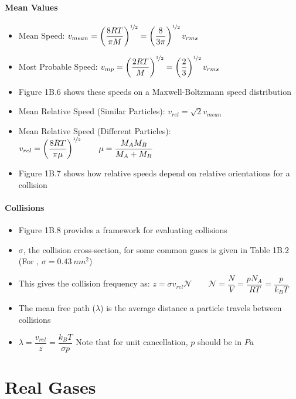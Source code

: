 \documentclass[12pt, openany, letterpaper]{memoir}
\begin{document}
\paragraph{Mean Values}
\begin{itemize}
	\item Mean Speed: $v_{mean} = \left(\dfrac{8RT}{\pi M}\right)^{\nicefrac{1}{2}} = \left(\dfrac{8}{3\pi}\right)^{\nicefrac{1}{2}}v_{rms}$
	\item Most Probable Speed: $v_{mp} = \left(\dfrac{2RT}{ M}\right)^{\nicefrac{1}{2}} = \left(\dfrac{2}{3}\right)^{\nicefrac{1}{2}}v_{rms}$
  \item Figure 1B.6 shows these speeds on a Maxwell-Boltzmann speed distribution
	\item Mean Relative Speed (Similar Particles): $v_{rel}=\sqrt{2}v_{mean}$
	\item Mean Relative Speed (Different Particles): $v_{rel} = \left(\dfrac{8RT}{\pi\mu}\right)^{\nicefrac{1}{2}} \hspace{2em} \mu = \dfrac{M_AM_B}{M_A+M_B}$
  \item Figure 1B.7 shows how relative speeds depend on relative orientations for a collision
\end{itemize}
\paragraph{Collisions}
\begin{itemize}
	\item Figure 1B.8 provides a framework for evaluating collisions
	\item $\sigma$, the collision cross-section, for some common gases is given in Table 1B.2 (For , $\sigma = 0.43~nm^2$)
	\item This gives the collision frequency as: $z=\sigma v_{rel}\mathcal{N}\hspace{2em}\mathcal{N} = \dfrac{N}{V} = \dfrac{pN_A}{RT} = \dfrac{p}{k_BT}$
	\item The mean free path ($\lambda$) is the average distance a particle travels between collisions
	\item $\lambda = \dfrac{v_{rel}}{z} = \dfrac{k_BT}{\sigma p}$ \hspace{2em} Note that for unit cancellation, $p$ should be in $Pa$
\end{itemize}

\section{Real Gases}
\end{document}
